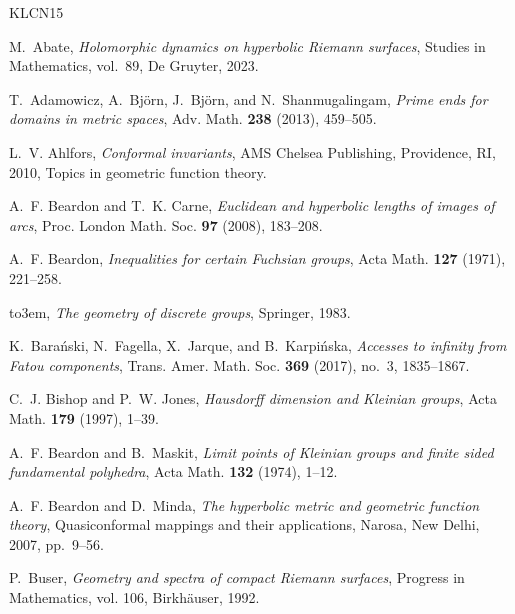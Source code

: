 \documentclass[11pt,a4paper,reqno]{amsart}
\theoremstyle{plain}
\theoremstyle{definition}
\theoremstyle{plain}
\begin{document}
\providecommand{\bysame}{\leavevmode\hbox to3em{\hrulefill}\thinspace}
\providecommand{\MR}{\relax\ifhmode\unskip\space\fi MR }
\providecommand{\MRhref}[2]{%
  \href{http://www.ams.org/mathscinet-getitem?mr=#1}{#2}
}
\providecommand{\href}[2]{#2}
\begin{thebibliography}{KLCN15}

M.~Abate, \emph{Holomorphic dynamics on hyperbolic {R}iemann surfaces}, Studies
  in Mathematics, vol.~89, De Gruyter, 2023.

T.~Adamowicz, A.~Bj\"{o}rn, J.~Bj\"{o}rn, and N.~Shanmugalingam, \emph{Prime
  ends for domains in metric spaces}, Adv. Math. \textbf{238} (2013), 459--505.

L.~V. Ahlfors, \emph{Conformal invariants}, AMS Chelsea Publishing, Providence,
  RI, 2010, Topics in geometric function theory.

A.~F. Beardon and T.~K. Carne, \emph{Euclidean and hyperbolic lengths of images
  of arcs}, Proc. London Math. Soc. \textbf{97} (2008), 183--208.

A.~F. Beardon, \emph{Inequalities for certain {F}uchsian groups}, Acta Math.
  \textbf{127} (1971), 221--258.

\bysame, \emph{The geometry of discrete groups}, Springer, 1983.

K.~Bara\'{n}ski, N.~Fagella, X.~Jarque, and B.~Karpi\'{n}ska, \emph{Accesses to
  infinity from {F}atou components}, Trans. Amer. Math. Soc. \textbf{369}
  (2017), no.~3, 1835--1867.

C.~J. Bishop and P.~W. Jones, \emph{Hausdorff dimension and {K}leinian groups},
  Acta Math. \textbf{179} (1997), 1--39.

A.~F. Beardon and B.~Maskit, \emph{Limit points of {K}leinian groups and finite
  sided fundamental polyhedra}, Acta Math. \textbf{132} (1974), 1--12.

A.~F. Beardon and D.~Minda, \emph{The hyperbolic metric and geometric function
  theory}, Quasiconformal mappings and their applications, Narosa, New Delhi,
  2007, pp.~9--56.

P.~Buser, \emph{Geometry and spectra of compact {R}iemann surfaces}, Progress
  in Mathematics, vol. 106, Birkh{\"a}user, 1992.


\end{thebibliography}
\end{document}
